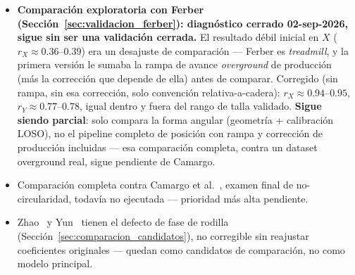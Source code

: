 \documentclass[11pt,a4paper]{scrartcl}
\begin{document}
\begin{itemize}
    \item \textbf{Comparación exploratoria con Ferber (Sección~\ref{sec:validacion_ferber}): diagnóstico cerrado 02-sep-2026, sigue sin ser una validación cerrada.} El resultado débil inicial en $X$ ($r_X\approx0.36$--$0.39$) era un desajuste de comparación --- Ferber es \emph{treadmill}, y la primera versión le sumaba la rampa de avance \emph{overground} de producción (más la corrección que depende de ella) antes de comparar. Corregido (sin rampa, sin esa corrección, solo convención relativa-a-cadera): $r_X\approx0.94$--$0.95$, $r_Y\approx0.77$--$0.78$, igual dentro y fuera del rango de talla validado. \textbf{Sigue siendo parcial}: solo compara la forma angular (geometría + calibración LOSO), no el pipeline completo de posición con rampa y corrección de producción incluidas --- esa comparación completa, contra un dataset overground real, sigue pendiente de Camargo.

    \item Comparación completa contra Camargo et al.~\cite{Camargo2021}, examen final de no-circularidad, todavía no ejecutada --- prioridad más alta pendiente.

    \item Zhao~\cite{Zhao2026} y Yun~\cite{Yun2014} tienen el defecto de fase de rodilla (Sección~\ref{sec:comparacion_candidatos}), no corregible sin reajustar coeficientes originales --- quedan como candidatos de comparación, no como modelo principal.


\end{itemize}
\end{document}

